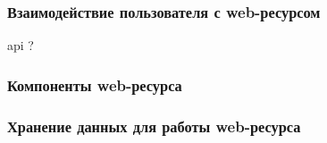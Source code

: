         \subsubsection{Взаимодействие пользователя с web-ресурсом}                            %
            api ?

        \subsubsection{Компоненты web-ресурса}                                                %

        \subsubsection{Хранение данных для работы web-ресурса}                                  %
    

\clearpage
